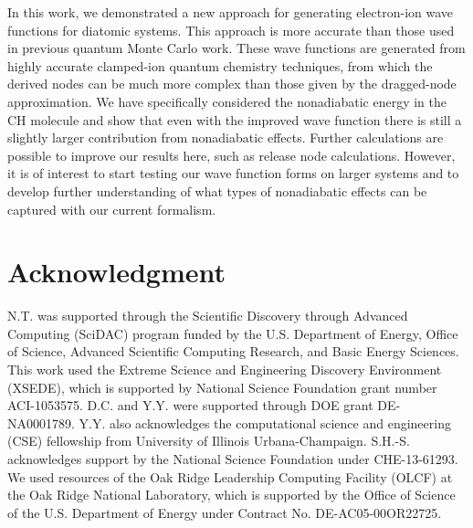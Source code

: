 \documentclass[aip,jcp,numerical,reprint]{revtex4-1}
\begin{document}
In this work, we demonstrated a new approach for generating electron-ion wave functions for diatomic systems. This approach is more accurate than those used in previous quantum Monte Carlo work.  These wave functions are generated from highly accurate clamped-ion quantum chemistry techniques, from which the derived nodes can be much more complex than those given by the dragged-node approximation.  We have specifically considered the nonadiabatic energy in the CH molecule and show that even with the improved wave function there is still a slightly larger contribution from nonadiabatic effects. Further calculations are possible to improve our results here, such as release node calculations. However, it is of interest to start testing our wave function forms on larger systems and to develop further understanding of what types of nonadiabatic effects can be captured with our current formalism.


\section{Acknowledgment}
N.T. was supported through the Scientific Discovery through Advanced Computing (SciDAC) program funded by the U.S. Department of Energy, Office of Science, Advanced Scientific Computing
Research, and Basic Energy Sciences.  This work used the Extreme Science and Engineering Discovery Environment (XSEDE), which is supported by National Science Foundation grant number ACI-1053575. D.C. and Y.Y. were supported through DOE grant DE-NA0001789. Y.Y. also acknowledges the computational science and engineering (CSE) fellowship from University of Illinois Urbana-Champaign. S.H.-S. acknowledges support by the National Science Foundation under CHE-13-61293. We used resources of the Oak Ridge Leadership Computing Facility (OLCF) at the Oak Ridge National Laboratory, which is supported by the Office of Science of the U.S. Department of Energy under Contract No. DE-AC05-00OR22725.


\end{document}
